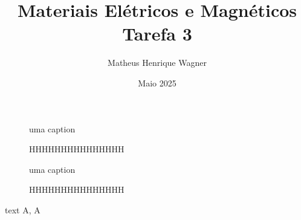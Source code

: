 \documentclass{homeworg}
\title{Materiais Elétricos e Magnéticos\\Tarefa 3}
\author{Matheus Henrique Wagner}
\date{Maio 2025}
\begin{document}
\maketitle

\begin{figure}[!h]
  \begin{minipage}{.49\linewidth}
    \centering
    
    \vspace{-1cm}
    \caption{uma caption}
  \end{minipage}%
  \begin{minipage}{.49\linewidth}
    \centering
    
    \vspace{-1cm}
    \caption{HHHHHHHHHHHHHHH}
  \end{minipage}
  \begin{minipage}{.49\linewidth}
    \centering
    
    \vspace{-1cm}
    \caption{uma caption}
  \end{minipage}%
  \begin{minipage}{.49\linewidth}
    \centering
    
    \vspace{-1cm}
    \caption{HHHHHHHHHHHHHHH}
  \end{minipage}%
\end{figure}

text $\si{\ampere}$, \si{\ampere}
\end{document}
